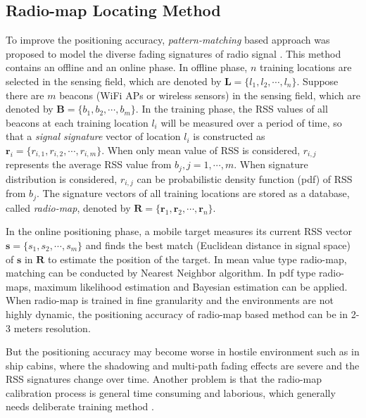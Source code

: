 \documentclass[conference, 10pt]{IEEEtran}
\begin{document}
\subsection{Radio-map Locating Method}
To improve the positioning accuracy, \emph{pattern-matching} based approach was proposed to model the diverse fading signatures of radio signal \cite{haque_profiling-based_2013}\cite{ni_landmarc:_2003}\cite{bahl_radar:_2000}. This method contains an offline and an online phase. In offline phase, $n$ training locations are selected in the sensing field, which are denoted by $\mathbf{L}=\{l_{1}, l_{2}, \cdots, l_{n}\}$.  Suppose there are $m$ beacons (WiFi APs or wireless sensors) in the sensing field, which are denoted by $\mathbf{B}=\{b_{1}, b_{2}, \cdots, b_{m}\}$.  In the training phase, the RSS values of all beacons at each training location $l_{i}$ will be measured over a period of time, so that a \emph{signal signature} vector of location $l_{i}$ is constructed as $\mathbf{r}_{i}=\{r_{i,1}, r_{i,2}, \cdots, r_{i,m}\}$. When only mean value of RSS is considered, $r_{i,j}$ represents the average RSS value from $b_{j}, j=1, \cdots, m$. When signature distribution is considered,  $r_{i,j}$ can be probabilistic density function (pdf) of RSS from $b_{j}$.  The signature vectors of all training locations are stored as a database,  called \emph{radio-map}, denoted by $\mathbf{R}=\{\mathbf{r}_{1}, \mathbf{r}_{2}, \cdots, \mathbf{r}_{n}\}$.  

In the online positioning phase, a mobile target measures its current RSS vector $\mathbf{s}=\{s_{1}, s_{2}, \cdots, s_{m}\}$ and finds the best match (Euclidean distance in signal space) of $\mathbf{s}$ in $\mathbf{R}$ to estimate the position of the target. In mean value type radio-map, matching can be conducted by Nearest Neighbor algorithm\cite{bahl_radar:_2000}. In pdf type radio-maps, maximum likelihood estimation and Bayesian estimation can be applied. 
When radio-map is trained in fine granularity and the environments are not highly dynamic, the positioning accuracy of radio-map based method can be in 2-3 meters resolution. 

But the positioning accuracy may become worse in hostile environment such as in ship cabins, where the shadowing and multi-path fading effects are severe and the RSS signatures change over time.  Another problem is that the radio-map calibration process is general time consuming and laborious, which generally needs deliberate training method \cite{scholl_fast_2012}. 
\end{document}

